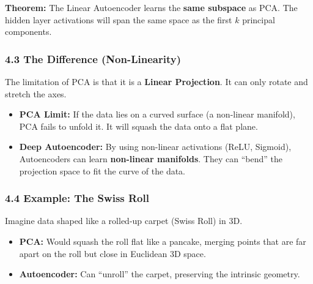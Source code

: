 \documentclass[
  italian,
  11pt,
]{article}
\begin{document}
\textbf{Theorem:} The Linear Autoencoder learns the \textbf{same
subspace} as PCA. The hidden layer activations will span the same space
as the first \(k\) principal components.

\subsubsection{4.3 The Difference
(Non-Linearity)}\label{the-difference-non-linearity}

The limitation of PCA is that it is a \textbf{Linear Projection}. It can
only rotate and stretch the axes.

\begin{itemize}
\item
  \textbf{PCA Limit:} If the data lies on a curved surface (a non-linear
  manifold), PCA fails to unfold it. It will squash the data onto a flat
  plane.
\item
  \textbf{Deep Autoencoder:} By using non-linear activations (ReLU,
  Sigmoid), Autoencoders can learn \textbf{non-linear manifolds}. They
  can ``bend'' the projection space to fit the curve of the data.
\end{itemize}

\subsubsection{4.4 Example: The Swiss
Roll}\label{example-the-swiss-roll}

Imagine data shaped like a rolled-up carpet (Swiss Roll) in 3D.

\begin{itemize}
\item
  \textbf{PCA:} Would squash the roll flat like a pancake, merging
  points that are far apart on the roll but close in Euclidean 3D space.
\item
  \textbf{Autoencoder:} Can ``unroll'' the carpet, preserving the
  intrinsic geometry.
\end{itemize}
\end{document}
